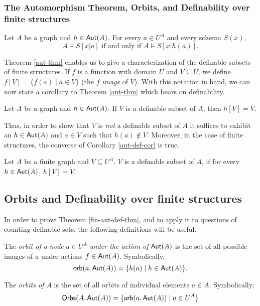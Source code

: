 \subsubsection*{The Automorphism Theorem, Orbits, and Definability over finite structures}
\begin{theorem}\label{aut-thm}
Let $A$ be a graph and $h\in\mbox{$\mathsf{Aut}(A)$}$. For every $a\in U^A$ and every schema $S(x)$,
\[
A\models S[x|a]\mbox{ if and only if }A\models S[x|h(a)]. 
\]
\end{theorem}

Theorem \ref{aut-thm} enables us to give a characterization of the definable subsets of finite structures. 
If $f$ is a function with domain $U$ and $V\subseteq U$, we define $f[V]=\{f(a)\mid a\in V\}$ (the $f$ \emph{image} of $V$). With this notation in hand, we can now state a corollary to Theorem \ref{aut-thm} which bears on definability.
\begin{corollary}\label{aut-def-cor}
Let $A$ be a graph and $h\in\mbox{$\mathsf{Aut}(A)$}$. If $V$ is a definable subset of $A$, then $h[V]=V$.
\end{corollary}
Thus, in order to show that $V$ is \emph{not} a definable subset of $A$ it suffices to exhibit an $h\in\mbox{$\mathsf{Aut}(A)$}$ and $a\in V$ such that $h(a)\not\in V$. Moreover, in the case of finite structures, the converse of Corollary \ref{aut-def-cor} is true.
\begin{theorem}\label{fin-aut-def-thm}
Let $A$ be a finite graph and $V\subseteq U^A$. $V$ is a definable subset of $A$, if for every $h\in\mbox{$\mathsf{Aut}(A)$}$, $h[V]=V$.
\end{theorem}

\subsection*{Orbits and Definability over finite structures}
In order to prove Theorem \ref{fin-aut-def-thm}, and to apply it to questions of counting definable sets, the following definitions will be useful. 

\begin{definition}
The \emph{orbit of a node} $a\in U^A$ \emph{under the action of} $\mbox{$\mathsf{Aut}(A)$}$ is the set of all possible images of $a$ under actions $f \in \mbox{$\mathsf{Aut}(A)$}$. Symbolically,
\[
\mbox{$\mathsf{orb}(a,\mbox{$\mathsf{Aut}(A)$})$}=\{h(a)\mid h\in\mbox{$\mathsf{Aut}(A)$}\}.
\]
\end{definition}

\begin{definition}
The \emph{orbits of $A$} is the set of all orbits of individual elements $a \in A$. Symbolically:
\[
    \mbox{$\mathsf{Orbs}(A,\mbox{$\mathsf{Aut}(A)$})$}=\{\mbox{$\mathsf{orb}(a,\mbox{$\mathsf{Aut}(A)$})$}\mid a\in U^A\}
\]
\end{definition}

